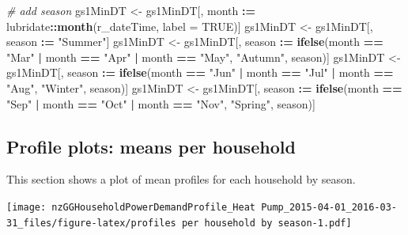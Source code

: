 \documentclass[]{article}
\newenvironment{Shaded}{\begin{snugshade}}{\end{snugshade}}
\newcommand{\KeywordTok}[1]{\textcolor[rgb]{0.13,0.29,0.53}{\textbf{#1}}}
\newcommand{\DataTypeTok}[1]{\textcolor[rgb]{0.13,0.29,0.53}{#1}}
\newcommand{\StringTok}[1]{\textcolor[rgb]{0.31,0.60,0.02}{#1}}
\newcommand{\CommentTok}[1]{\textcolor[rgb]{0.56,0.35,0.01}{\textit{#1}}}
\newcommand{\OtherTok}[1]{\textcolor[rgb]{0.56,0.35,0.01}{#1}}
\newcommand{\OperatorTok}[1]{\textcolor[rgb]{0.81,0.36,0.00}{\textbf{#1}}}
\newcommand{\ErrorTok}[1]{\textcolor[rgb]{0.64,0.00,0.00}{\textbf{#1}}}
\newcommand{\NormalTok}[1]{#1}
\begin{document}
\begin{Shaded}
\begin{Highlighting}[]
\CommentTok{# add season}
\NormalTok{gs1MinDT <-}\StringTok{ }\NormalTok{gs1MinDT[, month }\OperatorTok{:}\ErrorTok{=}\StringTok{ }\NormalTok{lubridate}\OperatorTok{::}\KeywordTok{month}\NormalTok{(r_dateTime, }\DataTypeTok{label =} \OtherTok{TRUE}\NormalTok{)]}
\NormalTok{gs1MinDT <-}\StringTok{ }\NormalTok{gs1MinDT[, season }\OperatorTok{:}\ErrorTok{=}\StringTok{ "Summer"}\NormalTok{]}
\NormalTok{gs1MinDT <-}\StringTok{ }\NormalTok{gs1MinDT[, season }\OperatorTok{:}\ErrorTok{=}\StringTok{ }\KeywordTok{ifelse}\NormalTok{(month }\OperatorTok{==}\StringTok{ "Mar"} \OperatorTok{|}
\StringTok{                                              }\NormalTok{month }\OperatorTok{==}\StringTok{ "Apr"} \OperatorTok{|}
\StringTok{                                              }\NormalTok{month }\OperatorTok{==}\StringTok{ "May"}\NormalTok{, }\StringTok{"Autumn"}\NormalTok{, season)]}
\NormalTok{gs1MinDT <-}\StringTok{ }\NormalTok{gs1MinDT[, season }\OperatorTok{:}\ErrorTok{=}\StringTok{ }\KeywordTok{ifelse}\NormalTok{(month }\OperatorTok{==}\StringTok{ "Jun"} \OperatorTok{|}
\StringTok{                                              }\NormalTok{month }\OperatorTok{==}\StringTok{ "Jul"} \OperatorTok{|}
\StringTok{                                              }\NormalTok{month }\OperatorTok{==}\StringTok{ "Aug"}\NormalTok{, }\StringTok{"Winter"}\NormalTok{, season)]}
\NormalTok{gs1MinDT <-}\StringTok{ }\NormalTok{gs1MinDT[, season }\OperatorTok{:}\ErrorTok{=}\StringTok{ }\KeywordTok{ifelse}\NormalTok{(month }\OperatorTok{==}\StringTok{ "Sep"} \OperatorTok{|}
\StringTok{                                              }\NormalTok{month }\OperatorTok{==}\StringTok{ "Oct"} \OperatorTok{|}
\StringTok{                                              }\NormalTok{month }\OperatorTok{==}\StringTok{ "Nov"}\NormalTok{, }\StringTok{"Spring"}\NormalTok{, season)]}
\end{Highlighting}
\end{Shaded}

\subsection{Profile plots: means per
household}\label{profile-plots-means-per-household}

This section shows a plot of mean profiles for each household by season.

\texttt{[image: nzGGHouseholdPowerDemandProfile\_Heat Pump\_2015-04-01\_2016-03-31\_files/figure-latex/profiles per household by season-1.pdf]}
\end{document}
